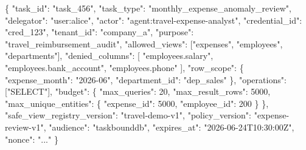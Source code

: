 \documentclass[
]{article}
\newenvironment{Shaded}{}{}
\newcommand{\DataTypeTok}[1]{\textcolor[rgb]{0.56,0.13,0.00}{#1}}
\newcommand{\DecValTok}[1]{\textcolor[rgb]{0.25,0.63,0.44}{#1}}
\newcommand{\FunctionTok}[1]{\textcolor[rgb]{0.02,0.16,0.49}{#1}}
\newcommand{\OtherTok}[1]{\textcolor[rgb]{0.00,0.44,0.13}{#1}}
\newcommand{\StringTok}[1]{\textcolor[rgb]{0.25,0.44,0.63}{#1}}
\begin{document}
\begin{Shaded}
\begin{Highlighting}[]
\FunctionTok{\{}
  \DataTypeTok{"task\_id"}\FunctionTok{:} \StringTok{"task\_456"}\FunctionTok{,}
  \DataTypeTok{"task\_type"}\FunctionTok{:} \StringTok{"monthly\_expense\_anomaly\_review"}\FunctionTok{,}
  \DataTypeTok{"delegator"}\FunctionTok{:} \StringTok{"user:alice"}\FunctionTok{,}
  \DataTypeTok{"actor"}\FunctionTok{:} \StringTok{"agent:travel{-}expense{-}analyst"}\FunctionTok{,}
  \DataTypeTok{"credential\_id"}\FunctionTok{:} \StringTok{"cred\_123"}\FunctionTok{,}
  \DataTypeTok{"tenant\_id"}\FunctionTok{:} \StringTok{"company\_a"}\FunctionTok{,}
  \DataTypeTok{"purpose"}\FunctionTok{:} \StringTok{"travel\_reimbursement\_audit"}\FunctionTok{,}
  \DataTypeTok{"allowed\_views"}\FunctionTok{:} \OtherTok{[}\StringTok{"expenses"}\OtherTok{,} \StringTok{"employees"}\OtherTok{,} \StringTok{"departments"}\OtherTok{]}\FunctionTok{,}
  \DataTypeTok{"denied\_columns"}\FunctionTok{:} \OtherTok{[}
    \StringTok{"employees.salary"}\OtherTok{,}
    \StringTok{"employees.bank\_account"}\OtherTok{,}
    \StringTok{"employees.phone"}
  \OtherTok{]}\FunctionTok{,}
  \DataTypeTok{"row\_scope"}\FunctionTok{:} \FunctionTok{\{}
    \DataTypeTok{"expense\_month"}\FunctionTok{:} \StringTok{"2026{-}06"}\FunctionTok{,}
    \DataTypeTok{"department\_id"}\FunctionTok{:} \StringTok{"dep\_sales"}
  \FunctionTok{\},}
  \DataTypeTok{"operations"}\FunctionTok{:} \OtherTok{[}\StringTok{"SELECT"}\OtherTok{]}\FunctionTok{,}
  \DataTypeTok{"budget"}\FunctionTok{:} \FunctionTok{\{}
    \DataTypeTok{"max\_queries"}\FunctionTok{:} \DecValTok{20}\FunctionTok{,}
    \DataTypeTok{"max\_result\_rows"}\FunctionTok{:} \DecValTok{5000}\FunctionTok{,}
    \DataTypeTok{"max\_unique\_entities"}\FunctionTok{:} \FunctionTok{\{}
      \DataTypeTok{"expense\_id"}\FunctionTok{:} \DecValTok{5000}\FunctionTok{,}
      \DataTypeTok{"employee\_id"}\FunctionTok{:} \DecValTok{200}
    \FunctionTok{\}}
  \FunctionTok{\},}
  \DataTypeTok{"safe\_view\_registry\_version"}\FunctionTok{:} \StringTok{"travel{-}demo{-}v1"}\FunctionTok{,}
  \DataTypeTok{"policy\_version"}\FunctionTok{:} \StringTok{"expense{-}review{-}v1"}\FunctionTok{,}
  \DataTypeTok{"audience"}\FunctionTok{:} \StringTok{"taskbounddb"}\FunctionTok{,}
  \DataTypeTok{"expires\_at"}\FunctionTok{:} \StringTok{"2026{-}06{-}24T10:30:00Z"}\FunctionTok{,}
  \DataTypeTok{"nonce"}\FunctionTok{:} \StringTok{"..."}
\FunctionTok{\}}
\end{Highlighting}
\end{Shaded}
\end{document}
